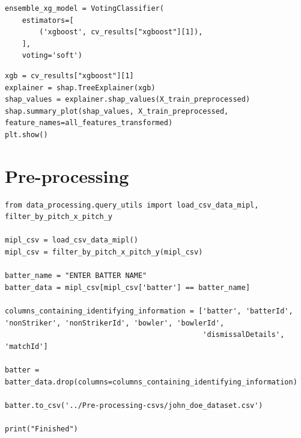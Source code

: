\documentclass[12pt,a4paper]{report}
\theoremstyle{definition}
\begin{document}
\begin{lstlisting}[label=code:VotingXG,  caption={Soft voting classifier for XGBoost}]
ensemble_xg_model = VotingClassifier(
    estimators=[
        ('xgboost', cv_results["xgboost"][1]),
    ],
    voting='soft')
\end{lstlisting}

\begin{lstlisting}[label=code:SHAPXG,  caption={SHAP explainer for XGBoost}]
xgb = cv_results["xgboost"][1]
explainer = shap.TreeExplainer(xgb)
shap_values = explainer.shap_values(X_train_preprocessed)
shap.summary_plot(shap_values, X_train_preprocessed, feature_names=all_features_transformed)
plt.show()
\end{lstlisting}

\section{Pre-processing}

\begin{lstlisting}[label=code:PreProcess,  caption={Code to filter data for a batter and remove identifying information}]
from data_processing.query_utils import load_csv_data_mipl, filter_by_pitch_x_pitch_y

mipl_csv = load_csv_data_mipl()
mipl_csv = filter_by_pitch_x_pitch_y(mipl_csv)

batter_name = "ENTER BATTER NAME"
batter_data = mipl_csv[mipl_csv['batter'] == batter_name]

columns_containing_identifying_information = ['batter', 'batterId', 'nonStriker', 'nonStrikerId', 'bowler', 'bowlerId',
                                              'dismissalDetails', 'matchId']

batter = batter_data.drop(columns=columns_containing_identifying_information)

batter.to_csv('../Pre-processing-csvs/john_doe_dataset.csv')

print("Finished")
\end{lstlisting}

\end{document}
